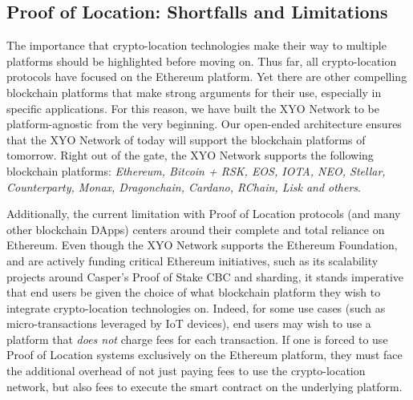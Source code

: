 \documentclass{article}
\begin{document}
\subsection {Proof of Location: Shortfalls and Limitations}
The importance that crypto-location technologies make their way to multiple platforms should be highlighted before moving on. Thus far, all crypto-location protocols have focused on the Ethereum platform. Yet there are other compelling blockchain platforms that make strong arguments for their use, especially in specific applications. For this reason, we have built the XYO Network to be platform-agnostic from the very beginning. Our open-ended architecture ensures that the XYO Network of today will support the blockchain platforms of tomorrow. Right out of the gate, the XYO Network supports the following blockchain platforms: \textit{Ethereum, Bitcoin + RSK, EOS, IOTA, NEO, Stellar, Counterparty, Monax, Dragonchain, Cardano, RChain, Lisk and others}.



Additionally, the current limitation with Proof of Location protocols (and many other blockchain DApps) centers around their complete and total reliance on Ethereum. Even though the XYO Network supports the Ethereum Foundation, and are actively funding critical Ethereum initiatives, such as its scalability projects around Casper's Proof of Stake CBC and sharding, it stands imperative that end users be given the choice of what blockchain platform they wish to integrate crypto-location technologies on. Indeed, for some use cases (such as micro-transactions leveraged by IoT devices), end users may wish to use a platform that \textit{does not} charge fees for each transaction. If one is forced to use Proof of Location systems exclusively on the Ethereum platform, they must face the additional overhead of not just paying fees to use the crypto-location network, but also fees to execute the smart contract on the underlying platform.
\end{document}
